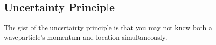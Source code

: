 \subsection{Uncertainty Principle}

The gist of the uncertainty principle 
is that you may not know both a waveparticle's 
momentum and location simultaneously. 
